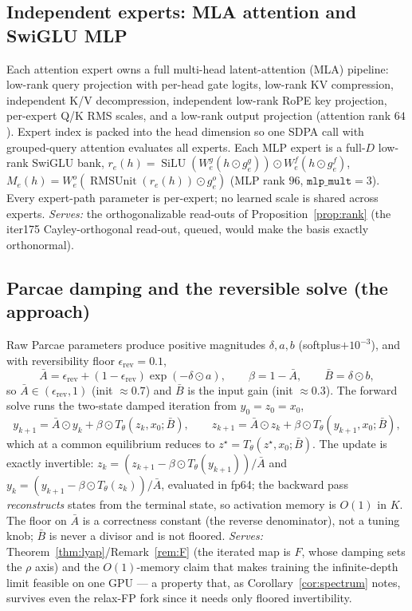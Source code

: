 \documentclass[11pt]{article}
\newcommand{\RMSUnit}{\operatorname{RMSUnit}}
\newcommand{\silu}{\operatorname{SiLU}}
\newcommand{\code}[1]{\texttt{#1}}
\begin{document}
\subsection{Independent experts: MLA attention and SwiGLU MLP}
\label{sec:experts}

Each attention expert owns a full multi-head latent-attention (MLA) pipeline: low-rank query
projection with per-head gate logits, low-rank KV compression, independent K/V decompression,
independent low-rank RoPE key projection, per-expert Q/K RMS scales, and a low-rank output
projection (attention rank $64$).  Expert index is packed into the head dimension so one SDPA call
with grouped-query attention evaluates all experts.  Each MLP expert is a full-$D$ low-rank
SwiGLU bank, $r_e(h)=\silu(W^g_e(h\odot g^g_e))\odot W^f_e(h\odot g^f_e)$,
$M_e(h)=W^o_e(\RMSUnit(r_e(h))\odot g^o_e)$ (MLP rank $96$, $\code{mlp\_mult}=3$).  Every
expert-path parameter is per-expert; no learned scale is shared across experts.  \emph{Serves:}
the orthogonalizable read-outs of Proposition~\ref{prop:rank} (the iter175 Cayley-orthogonal
read-out, queued, would make the basis exactly orthonormal).

\subsection{Parcae damping and the reversible solve (the approach)}
\label{sec:revdeq}

Raw Parcae parameters produce positive magnitudes $\delta,a,b$ (softplus$+10^{-3}$), and with
reversibility floor $\epsilon_{\mathrm{rev}}=0.1$,
\[
  \bar A=\epsilon_{\mathrm{rev}}+(1-\epsilon_{\mathrm{rev}})\exp(-\delta\odot a),
  \qquad \beta=1-\bar A,\qquad \bar B=\delta\odot b,
\]
so $\bar A\in(\epsilon_{\mathrm{rev}},1)$ (init $\approx0.7$) and $\bar B$ is the input gain
(init $\approx0.3$).  The forward solve runs the two-state damped iteration from $y_0=z_0=x_0$,
\[
  y_{k+1}=\bar A\odot y_k+\beta\odot T_\theta(z_k,x_0;\bar B),\qquad
  z_{k+1}=\bar A\odot z_k+\beta\odot T_\theta(y_{k+1},x_0;\bar B),
\]
which at a common equilibrium reduces to $z^\star=T_\theta(z^\star,x_0;\bar B)$.  The update is
exactly invertible: $z_k=(z_{k+1}-\beta\odot T_\theta(y_{k+1}))/\bar A$ and
$y_k=(y_{k+1}-\beta\odot T_\theta(z_k))/\bar A$, evaluated in fp64; the backward pass
\emph{reconstructs} states from the terminal state, so activation memory is $O(1)$ in $K$.  The
floor on $\bar A$ is a correctness constant (the reverse denominator), not a tuning knob; $\bar B$
is never a divisor and is not floored.  \emph{Serves:} Theorem~\ref{thm:lyap}/Remark~\ref{rem:F}
(the iterated map is $F$, whose damping sets the $\rho$ axis) and the $O(1)$-memory claim that
makes training the infinite-depth limit feasible on one GPU --- a property that, as
Corollary~\ref{cor:spectrum} notes, survives even the relax-FP fork since it needs only floored
invertibility.
\end{document}

